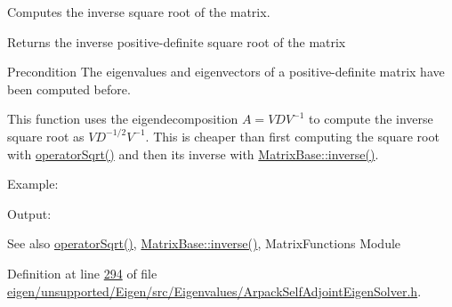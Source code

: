 Computes the inverse square root of the matrix. 

\begin{DoxyReturn}{Returns}
the inverse positive-\/definite square root of the matrix
\end{DoxyReturn}
\begin{DoxyPrecond}{Precondition}
The eigenvalues and eigenvectors of a positive-\/definite matrix have been computed before.
\end{DoxyPrecond}
This function uses the eigendecomposition $ A = V D V^{-1} $ to compute the inverse square root as $ V D^{-1/2} V^{-1} $. This is cheaper than first computing the square root with \hyperlink{class_eigen_1_1_arpack_generalized_self_adjoint_eigen_solver_a7522aad061ebccc065b254c0bc67d3b0}{operator\+Sqrt()} and then its inverse with \hyperlink{group___core___module_a7712eb69e8ea3c8f7b8da1c44dbdeebf}{Matrix\+Base\+::inverse()}.

Example\+: 
\begin{DoxyCodeInclude}
\end{DoxyCodeInclude}
 Output\+: 
\begin{DoxyVerbInclude}
\end{DoxyVerbInclude}


\begin{DoxySeeAlso}{See also}
\hyperlink{class_eigen_1_1_arpack_generalized_self_adjoint_eigen_solver_a7522aad061ebccc065b254c0bc67d3b0}{operator\+Sqrt()}, \hyperlink{group___core___module_a7712eb69e8ea3c8f7b8da1c44dbdeebf}{Matrix\+Base\+::inverse()}, Matrix\+Functions Module 
\end{DoxySeeAlso}


Definition at line \hyperlink{eigen_2unsupported_2_eigen_2src_2_eigenvalues_2_arpack_self_adjoint_eigen_solver_8h_source_l00294}{294} of file \hyperlink{eigen_2unsupported_2_eigen_2src_2_eigenvalues_2_arpack_self_adjoint_eigen_solver_8h_source}{eigen/unsupported/\+Eigen/src/\+Eigenvalues/\+Arpack\+Self\+Adjoint\+Eigen\+Solver.\+h}.

\mbox{\label{class_eigen_1_1_arpack_generalized_self_adjoint_eigen_solver_a7522aad061ebccc065b254c0bc67d3b0}} 
